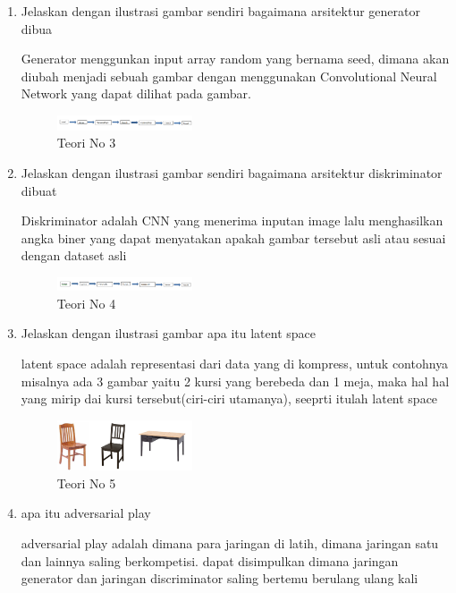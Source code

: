 \begin{enumerate}
            \item Jelaskan dengan ilustrasi gambar sendiri bagaimana arsitektur generator dibua
            \par Generator menggunkan input array random yang bernama seed, dimana akan diubah menjadi sebuah gambar dengan menggunakan Convolutional Neural Network yang dapat dilihat pada gambar.
            \begin{figure}[H]
                \includegraphics[width=4cm]{figures/1174040/chapter8/teori3.png}
                \centering
                  \caption{Teori No 3}
            \end{figure}

            \item Jelaskan dengan ilustrasi gambar sendiri bagaimana arsitektur diskriminator dibuat
            \par Diskriminator adalah CNN yang menerima inputan image lalu menghasilkan angka biner yang dapat menyatakan apakah gambar tersebut asli atau sesuai dengan dataset asli
            \begin{figure}[H]
                \includegraphics[width=4cm]{figures/1174040/chapter8/teori4.png}
                \centering
                  \caption{Teori No 4}
            \end{figure}

            \item Jelaskan dengan ilustrasi gambar apa itu latent space
            \par latent space adalah representasi dari data yang di kompress, untuk contohnya misalnya ada 3 gambar yaitu 2 kursi yang berebeda dan 1 meja, maka hal hal yang mirip dai kursi tersebut(ciri-ciri utamanya), seeprti itulah latent space
            \begin{figure}[H]
                \includegraphics[width=4cm]{figures/1174040/chapter8/teori5.png}
                \centering
                  \caption{Teori No 5}
            \end{figure}

            \item apa itu adversarial play
            \par adversarial play adalah dimana para jaringan di latih, dimana jaringan satu dan lainnya saling berkompetisi. dapat disimpulkan dimana jaringan generator dan jaringan discriminator saling bertemu berulang ulang kali
            

\end{enumerate}
